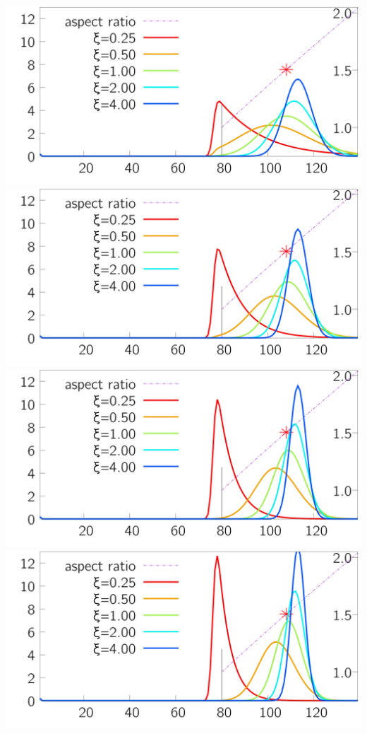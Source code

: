 \begin{minipage}{0.25\textwidth} 
 \includegraphics[width=\textwidth ]{../plots_size-distribution_png/plot_size-distribution_eagg2-ki1__xi.png}
\includegraphics[width=\textwidth ]{../plots_size-distribution_png/plot_size-distribution_eagg2-ki2__xi.png}
\includegraphics[width=\textwidth ]{../plots_size-distribution_png/plot_size-distribution_eagg2-ki3__xi.png}
\includegraphics[width=\textwidth ]{../plots_size-distribution_png/plot_size-distribution_eagg2-ki4__xi.png}
\end{minipage}%
